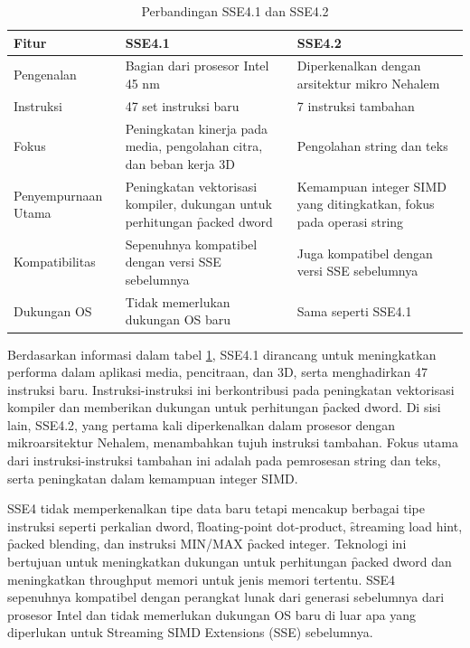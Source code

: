 \begin{table}[h]
	\centering
	\begin{tabular}{|p{3cm}|p{4.6cm}|p{4.6cm}|}
		\hline
		\textbf{Fitur} & \textbf{SSE4.1} & \textbf{SSE4.2} \\ \hline
		Pengenalan & Bagian dari prosesor Intel 45 nm & Diperkenalkan dengan arsitektur mikro Nehalem \\ \hline
		Instruksi & 47 set instruksi baru & 7 instruksi tambahan \\ \hline
		Fokus & Peningkatan kinerja pada media, pengolahan citra, dan beban kerja 3D & Pengolahan string dan teks \\ \hline
		Penyempurnaan Utama & Peningkatan vektorisasi kompiler, dukungan untuk perhitungan \f{packed dword} & Kemampuan integer SIMD yang ditingkatkan, fokus pada operasi string \\ \hline
		Kompatibilitas & Sepenuhnya kompatibel dengan versi SSE sebelumnya & Juga kompatibel dengan versi SSE sebelumnya \\ \hline
		Dukungan OS & Tidak memerlukan dukungan OS baru & Sama seperti SSE4.1 \\ \hline
	\end{tabular}
	\caption{Perbandingan SSE4.1 dan SSE4.2}
	\label{table:perbandingan_sse4}
\end{table}

Berdasarkan informasi dalam tabel \ref{table:perbandingan_sse4}, SSE4.1 dirancang untuk meningkatkan performa dalam aplikasi media, pencitraan, dan 3D, serta menghadirkan 47 instruksi baru. Instruksi-instruksi ini berkontribusi pada peningkatan vektorisasi kompiler dan memberikan dukungan untuk perhitungan \f{packed dword}. Di sisi lain, SSE4.2, yang pertama kali diperkenalkan dalam prosesor dengan mikroarsitektur Nehalem, menambahkan tujuh instruksi tambahan. Fokus utama dari instruksi-instruksi tambahan ini adalah pada pemrosesan string dan teks, serta peningkatan dalam kemampuan integer SIMD\cite{sse4reference}.

SSE4 tidak memperkenalkan tipe data baru tetapi mencakup berbagai tipe instruksi seperti perkalian dword, \f{floating-point dot-product}, \f{streaming load hint}, \f{packed blending}, dan instruksi MIN/MAX \f{packed integer}. Teknologi ini bertujuan untuk meningkatkan dukungan untuk perhitungan \f{packed dword} dan meningkatkan throughput memori untuk jenis memori tertentu. SSE4 sepenuhnya kompatibel dengan perangkat lunak dari generasi sebelumnya dari prosesor Intel dan tidak memerlukan dukungan OS baru di luar apa yang diperlukan untuk Streaming SIMD Extensions (SSE) sebelumnya\cite{sse4reference}.



